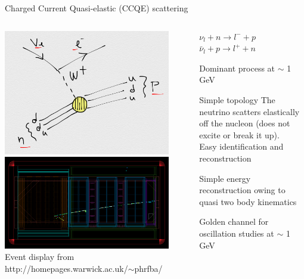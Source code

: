 \begin{frame}{Charged Current Quasi-elastic (CCQE) scattering}
\begin{columns}
  \begin{column}{0.50\textwidth}
   \begin{center}
    \includegraphics[width=0.90\textwidth]{./images/nuint/feyn/ccqe_feynman_diagram_0.png}\\
    \includegraphics[width=0.90\textwidth]{./images/nuint/evdisplay/ccqe_t2k_p0d_event_display_0.png}\\
    {\tiny Event display from http://homepages.warwick.ac.uk/$\sim$phrfba/}
    \end{center}
  \end{column}
  \begin{column}{0.50\textwidth}
    $\nu_{l} + n \rightarrow l^{-} + p$\\
    $\bar{\nu}_{l} + p \rightarrow l^{+} + n$\\
    \begin{itemize}
    {\scriptsize
     \item Dominant process at $\sim$ 1 GeV
     \item Simple topology
      The neutrino scatters elastically off the nucleon (does not excite or break it up).\\
      Easy identification and reconstruction
     \item Simple energy reconstruction owing to quasi two body kinematics
     \item Golden channel for oscillation studies at $\sim$ 1 GeV
    }
    \end{itemize}
  \end{column}
\end{columns}
\end{frame}



